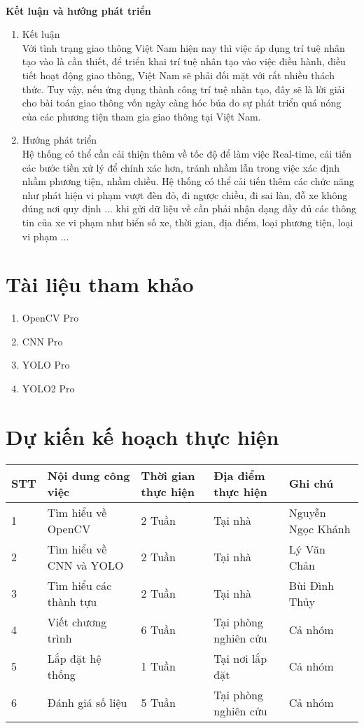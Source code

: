 \documentclass[12pt,twoside,a4paper]{article}
\begin{document}
\leavevmode \\
\textbf {Kết luận và hướng phát triển}
\begin{enumerate}
	\item Kết luận \\
	Với tình trạng giao thông Việt Nam hiện nay thì việc áp dụng trí tuệ nhân tạo vào là cần thiết, để triển khai trí tuệ nhân tạo vào việc điều hành, điều tiết hoạt động giao thông, Việt Nam sẽ phải đối mặt với rất nhiều thách thức. Tuy vậy, nếu ứng dụng thành công trí tuệ nhân tạo, đây sẽ là lời giải cho bài toán giao thông vốn ngày càng hóc búa do sự phát triển quá nóng của các phương tiện tham gia giao thông tại Việt Nam.
	\item Hướng phát triển \\
	Hệ thống có thể cần cải thiện thêm về tốc độ để làm việc Real-time, cải tiến các bước tiền xử lý để chính xác hơn, tránh nhầm lẫn trong việc xác định nhầm phương tiện, nhầm chiều. Hệ thống có thể cải tiến thêm các chức năng như phát hiện vi phạm vượt đèn đỏ, đi ngược chiều, đi sai làn, đỗ xe không đúng nơi quy định ... khi gửi dữ liệu về cần phải nhận dạng đầy đủ các thông tin của xe vi phạm như biển số xe, thời gian, địa điểm, loại phương tiện, loại vi phạm ...
\end{enumerate}
\section{Tài liệu tham khảo}
\renewcommand{\labelenumi}{[\arabic{enumi}]}
\begin{enumerate}
	\item OpenCV Pro
	\item CNN Pro
	\item YOLO Pro
	\item YOLO2 Pro
\end{enumerate}

\section{Dự kiến kế hoạch thực hiện}

\renewcommand{\arraystretch}{2}
\begin{center}
	\begin{tabular}{|p{10mm}|p{48mm}|p{22mm}|p{26mm}|l|} 
		\hline 
		STT & Nội dung công việc & Thời gian thực hiện & Địa điểm thực hiện & Ghi chú \\ 
		\hline
		1 & Tìm hiểu về OpenCV & 2 Tuần & Tại nhà & Nguyễn Ngọc Khánh \\
		\hline
		2 & Tìm hiểu về CNN và YOLO & 2 Tuần & Tại nhà & Lý Văn Chản \\
		\hline
		3 & Tìm hiểu các thành tựu & 2 Tuần & Tại nhà & Bùi Đình Thủy \\
		\hline
		4 & Viết chương trình & 6 Tuần & Tại phòng nghiên cứu & Cả nhóm \\
		\hline
		5 & Lắp đặt hệ thống & 1 Tuần & Tại nơi lắp đặt & Cả nhóm \\
		\hline
		6 & Đánh giá số liệu & 5 Tuần & Tại phòng nghiên cứu & Cả nhóm \\
		\hline
	\end{tabular}
\end{center}
\end{document}
